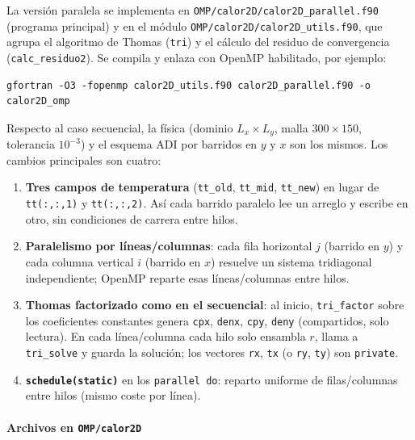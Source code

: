 \documentclass[11pt,a4paper]{article}
\begin{document}
La versi\'on paralela se implementa en
\texttt{OMP/calor2D/calor2D\_parallel.f90} (programa principal) y en el
m\'odulo \texttt{OMP/calor2D/calor2D\_utils.f90}, que agrupa el algoritmo de
Thomas (\texttt{tri}) y el c\'alculo del residuo de convergencia
(\texttt{calc\_residuo2}). Se compila y enlaza con OpenMP habilitado, por
ejemplo:

\begin{verbatim}
gfortran -O3 -fopenmp calor2D_utils.f90 calor2D_parallel.f90 -o calor2D_omp
\end{verbatim}

\medskip

Respecto al caso secuencial, la f\'isica (dominio $L_x\times L_y$, malla
$300\times 150$, tolerancia $10^{-3}$) y el esquema ADI por barridos en $y$ y
$x$ son los mismos. Los cambios principales son cuatro:

\begin{enumerate}
  \item \textbf{Tres campos de temperatura} (\texttt{tt\_old}, \texttt{tt\_mid},
        \texttt{tt\_new}) en lugar de \texttt{tt(:,:,1)} y \texttt{tt(:,:,2)}.
        As\'i cada barrido paralelo lee un arreglo y escribe en otro, sin
        condiciones de carrera entre hilos.
  \item \textbf{Paralelismo por l\'ineas/columnas}: cada fila horizontal $j$
        (barrido en $y$) y cada columna vertical $i$ (barrido en $x$) resuelve
        un sistema tridiagonal independiente; OpenMP reparte esas
        l\'ineas/columnas entre hilos.
  \item \textbf{Thomas factorizado como en el secuencial}: al inicio,
        \texttt{tri\_factor} sobre los coeficientes constantes genera
        \texttt{cpx}, \texttt{denx}, \texttt{cpy}, \texttt{deny} (compartidos,
        solo lectura). En cada l\'inea/columna cada hilo solo ensambla $r$,
        llama a \texttt{tri\_solve} y guarda la soluci\'on; los vectores
        \texttt{rx}, \texttt{tx} (o \texttt{ry}, \texttt{ty}) son \texttt{private}.
  \item \textbf{\texttt{schedule(static)}} en los \texttt{parallel do}: reparto
        uniforme de filas/columnas entre hilos (mismo coste por l\'inea).
\end{enumerate}

\paragraph{Archivos en \texttt{OMP/calor2D}}
\end{document}
